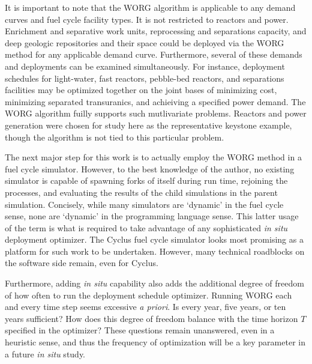 It is important to note that the WORG algorithm is applicable to any
demand curves and fuel cycle facility types. It is not restricted to
reactors and power. Enrichment and separative work units, reprocessing
and separations capacity, and deep geologic repositories and their
space could be deployed via the WORG method for any applicable demand
curve. Furthermore, several of these demands and deployments can be
examined simultaneously. For instance, deployment schedules for light-water,
fast reactors, pebble-bed reactors, and separations facilities may be optimized
together on the joint
bases of minimizing cost, minimizing separated transuranics, and achieiving
a specified power demand. The WORG algorithm fuilly supports such mutlivariate
problems. Reactors and power generation were chosen for study here as the
representative keystone example, though the algorithm is not tied to this
particular problem.

The next major step for this work is to actually employ the WORG method in
a fuel cycle simulator.  However, to the best knowledge of the
author, no existing simulator is capable of spawning forks of itself
during run time, rejoining the processes, and evaluating the results of the
child simulations in the parent simulation. Concisely, while many simulators
are
`dynamic' in the fuel cycle sense, none are `dynamic' in the programming
language sense. This latter usage of the term is what is required to
take advantage of any sophisticated \emph{in situ} deployment optimizer.
The Cyclus fuel cycle simulator looks most promising as a platform
for such work to be undertaken. However, many technical roadblocks
on the software side remain, even for Cyclus.

Furthermore, adding \emph{in situ} capability also adds the additional
degree of freedom of how often to run the deployment schedule optimizer.
Running WORG each and every
time step seems excessive \emph{a priori}. Is every year, five years,
or ten years sufficient? How does this degree of freedom balance with the
time horizon $T$ specified in the optimizer? These questions remain unanswered, even
in a heuristic sense, and thus the frequency of optimization will be a key
parameter in a future \emph{in situ} study.
